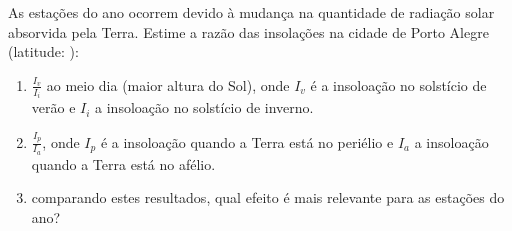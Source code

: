 \newpage
{}
\begin{prob}[ref: P21]
	As estações do ano ocorrem devido à mudança na quantidade de radiação solar absorvida pela Terra. Estime a razão das insolações na cidade de Porto Alegre (latitude: ):
	\begin{enumerate}[label=\alph *)]
		\item $\frac{I_v}{I_i}$ ao meio dia (maior altura do Sol), onde $I_v$ é a insoloação no solstício de verão e $I_i$ a insoloação no solstício de inverno.
		\item $\frac{I_p}{I_a}$, onde $I_p$ é a insoloação quando a Terra está no periélio e $I_a$ a insoloação quando a Terra está no afélio.
		\item comparando estes resultados, qual efeito é mais relevante para as estações do ano?
	\end{enumerate}
\end{prob}

